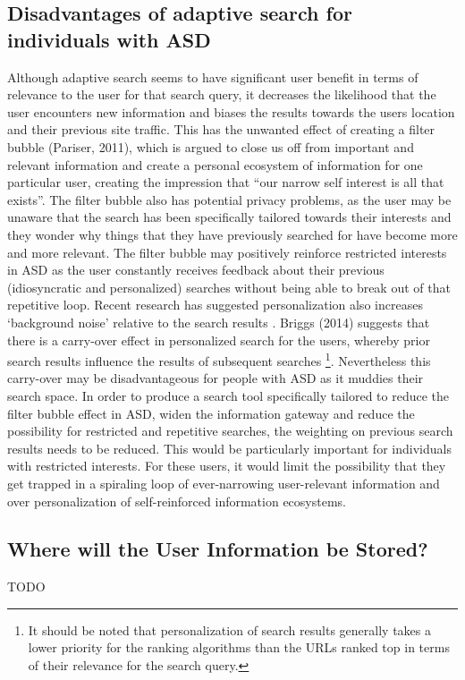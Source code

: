 \documentclass[10pt]{article}
\begin{document}
\subsection{Disadvantages of adaptive search for individuals with ASD}
Although adaptive search seems to have significant user benefit in terms of relevance to the user for that search query, it decreases the likelihood that the user encounters new information and biases the results towards the users location and their previous site traffic.  This has the unwanted effect of creating a filter bubble (Pariser, 2011), which is argued to close us off from important and relevant information and create a personal ecosystem of information for one particular user, creating the impression that “our narrow self interest is all that exists”. The filter bubble also has potential privacy problems, as the user may be unaware that the search has been specifically tailored towards their interests and they wonder why things that they have previously searched for have become more and more relevant. The filter bubble may positively reinforce restricted interests in ASD as the user constantly receives feedback about their previous (idiosyncratic and personalized) searches without being able to break out of that repetitive loop. 
Recent research has suggested personalization also increases ‘background noise’ relative to the search results \cite{briggs}. Briggs (2014) suggests that there is a carry-over effect in personalized search for the users, whereby prior search results influence the results of subsequent searches \footnote{It should be noted that personalization of search results generally takes a lower priority for the ranking algorithms than the URLs ranked top in terms of their relevance for the search query.}.  Nevertheless this carry-over may be disadvantageous for people with ASD as it muddies their search space.
In order to produce a search tool specifically tailored to reduce the filter bubble effect in ASD, widen the information gateway and reduce the possibility for restricted and repetitive searches, the weighting on previous search results needs to be reduced. This would be particularly important for individuals with restricted interests. For these users, it would limit the possibility that they get trapped in a spiraling loop of ever-narrowing user-relevant information and over personalization of self-reinforced information ecosystems.

\subsection{Where will the User Information be Stored?}
TODO\\
\end{document}
